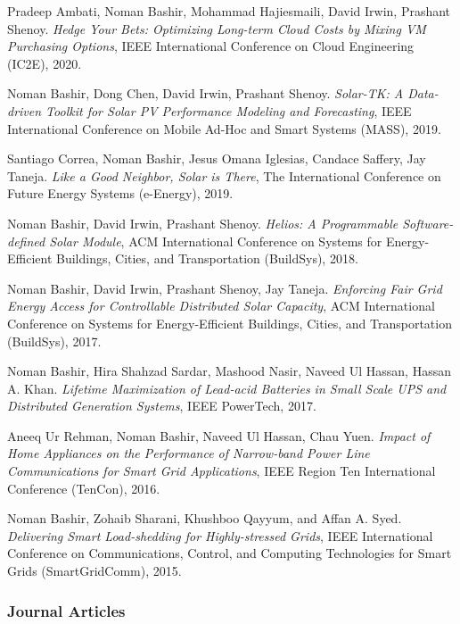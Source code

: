 \documentclass[11pt, a4paper, DIV=12]{scrartcl}
\begin{document}
\begin{thebibliography}{5}
	Pradeep Ambati, Noman Bashir, Mohammad Hajiesmaili, David Irwin, Prashant Shenoy.
	\emph{Hedge Your Bets: Optimizing Long-term Cloud Costs by Mixing VM Purchasing Options},
	IEEE International Conference on Cloud Engineering (IC2E), 2020.
	
	Noman Bashir, Dong Chen, David Irwin, Prashant Shenoy.
	\emph{Solar-TK: A Data-driven Toolkit for Solar PV Performance Modeling and Forecasting},
	IEEE International Conference on Mobile Ad-Hoc and Smart Systems (MASS), 2019.
	
    Santiago Correa, Noman Bashir, Jesus Omana Iglesias, Candace Saffery, Jay Taneja.
	\emph{Like a Good Neighbor, Solar is There},
	The International Conference on Future Energy Systems (e-Energy), 2019.
	
	Noman Bashir, David Irwin, Prashant Shenoy.
	\emph{Helios: A Programmable Software-defined Solar Module},
	ACM International Conference on Systems for Energy-Efficient Buildings, Cities, and Transportation (BuildSys), 2018.
	
    Noman Bashir, David Irwin, Prashant Shenoy, Jay Taneja.
	\emph{Enforcing Fair Grid Energy Access for Controllable Distributed Solar Capacity},
	ACM International Conference on Systems for Energy-Efficient Buildings, Cities, and Transportation (BuildSys), 2017.
	
    Noman Bashir, Hira Shahzad Sardar, Mashood Nasir, Naveed Ul Hassan, Hassan A. Khan.
	\emph{Lifetime Maximization of Lead-acid Batteries in Small Scale UPS and Distributed Generation Systems},
	IEEE PowerTech, 2017.

    Aneeq Ur Rehman, Noman Bashir, Naveed Ul Hassan, Chau Yuen.
	\emph{Impact of Home Appliances on the Performance of Narrow-band Power Line Communications for Smart Grid Applications},
	IEEE Region Ten International Conference (TenCon), 2016.
	
    Noman Bashir, Zohaib Sharani, Khushboo Qayyum, and Affan A. Syed.
	\emph{Delivering Smart Load-shedding for Highly-stressed Grids},
	IEEE International Conference on Communications, Control, and Computing Technologies for Smart Grids (SmartGridComm), 2015.


\subsubsection*{Journal Articles}


\end{thebibliography}
\end{document}

